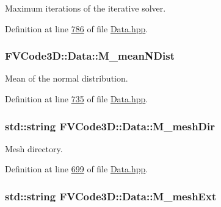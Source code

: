 Maximum iterations of the iterative solver. 



Definition at line \hyperlink{Data_8hpp_source_l00786}{786} of file \hyperlink{Data_8hpp_source}{Data.\+hpp}.

\subsubsection[{\texorpdfstring{M\+\_\+mean\+N\+Dist}{M_meanNDist}}]{ F\+V\+Code3\+D\+::\+Data\+::\+M\+\_\+mean\+N\+Dist\hspace{0.3cm}{\ttfamily [protected]}}\hypertarget{classFVCode3D_1_1Data_aa9b032547f332b068770fa4eebe44462}{}\label{classFVCode3D_1_1Data_aa9b032547f332b068770fa4eebe44462}


Mean of the normal distribution. 



Definition at line \hyperlink{Data_8hpp_source_l00735}{735} of file \hyperlink{Data_8hpp_source}{Data.\+hpp}.

\subsubsection[{\texorpdfstring{M\+\_\+mesh\+Dir}{M_meshDir}}]{\setlength{\rightskip}{0pt plus 5cm}std\+::string F\+V\+Code3\+D\+::\+Data\+::\+M\+\_\+mesh\+Dir\hspace{0.3cm}{\ttfamily [protected]}}\hypertarget{classFVCode3D_1_1Data_ac3c807842fa923bda89a90635b51daea}{}\label{classFVCode3D_1_1Data_ac3c807842fa923bda89a90635b51daea}


Mesh directory. 



Definition at line \hyperlink{Data_8hpp_source_l00699}{699} of file \hyperlink{Data_8hpp_source}{Data.\+hpp}.

\subsubsection[{\texorpdfstring{M\+\_\+mesh\+Ext}{M_meshExt}}]{\setlength{\rightskip}{0pt plus 5cm}std\+::string F\+V\+Code3\+D\+::\+Data\+::\+M\+\_\+mesh\+Ext\hspace{0.3cm}{\ttfamily [protected]}}\hypertarget{classFVCode3D_1_1Data_a6808fd51d3a0b46b77ddd500c836abb9}{}\label{classFVCode3D_1_1Data_a6808fd51d3a0b46b77ddd500c836abb9}


